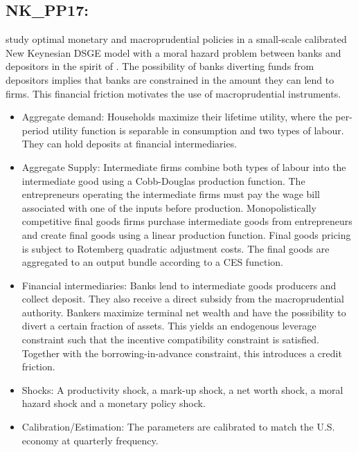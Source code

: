 \documentclass[11pt,a4paper]{article}
\begin{document}
	\subsection{NK\_PP17: \texorpdfstring{\cite{paoli2017coordinating}}{Paoli and Paustian (2017)}}
	\label{NKPP17}
	\cite{paoli2017coordinating} study optimal monetary and macroprudential policies in a small-scale calibrated New Keynesian DSGE model with a moral hazard problem between banks and depositors in the spirit of \cite{GertlerKaradi2011}. The possibility of banks diverting funds from depositors implies that banks are constrained in the amount they can lend to firms. This financial friction motivates the use of macroprudential instruments.
	\begin{itemize}
		\item Aggregate demand: Households maximize their lifetime utility, where the per-period utility function is separable in consumption and two types of labour. They can hold deposits at financial intermediaries. 
		\item Aggregate Supply: Intermediate firms combine both types of labour into the intermediate good using a Cobb-Douglas production function. The entrepreneurs operating the intermediate firms must pay the wage bill associated with one of the inputs before production. Monopolistically competitive final goods firms purchase intermediate goods from entrepreneurs and create final goods using a linear production function. Final goods pricing is subject to Rotemberg quadratic adjustment costs. The final goods are aggregated to an output bundle according to a CES function. 
		\item Financial intermediaries: Banks lend to intermediate goods producers and collect deposit. They also receive a direct subsidy from the macroprudential authority. Bankers maximize terminal net wealth and have the possibility to divert a certain fraction of assets. This  yields an endogenous leverage constraint such that the incentive compatibility constraint is satisfied. Together with the borrowing-in-advance constraint, this introduces a credit friction. 
		\item Shocks: A productivity shock, a mark-up shock, a net worth shock, a moral hazard shock and a monetary policy shock.
		\item Calibration/Estimation: The parameters are calibrated to match the U.S. economy at quarterly frequency.
		
	\end{itemize}
	
\end{document}
